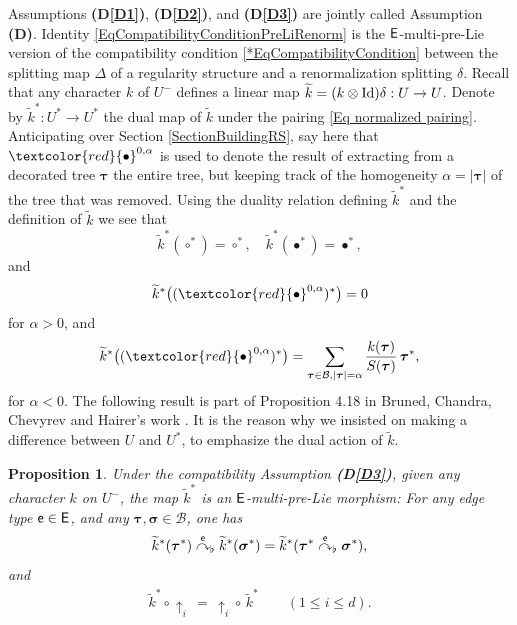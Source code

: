 \documentclass[10pt, reqno]{amsart}
\numberwithin{subsection}{section}
\numberwithin{subsubsection}{subsection}
\numberwithin{equation}{section} %
\theoremstyle{mystyle}
\newtheorem{prop}[thm]{\hspace{-0.13cm} {Proposition}}%
\theoremstyle{mystyle2}
\theoremstyle{mystyle3}
\newcommand{\refD}[1]{\textbf{\textsf{(D\ref{#1})}}}
\newcommand{\REFD}{\textbf{\textsf{(D)}}}
\newcommand{\iden}{\text{\rm Id}}
\newcommand{\bstau}{\boldsymbol{\tau}}
\newcommand{\bssigma}{\boldsymbol{\sigma}}
\newcommand{\flatgrafting}{\overset{\sf e}{\curvearrowright}_{\flat}}
\newcommand{\mcB}{\mathcal{B}}
\begin{document}
Assumptions \refD{D1}, \refD{D2}, and \refD{D3} are jointly called Assumption \REFD.
Identity \eqref{EqCompatibilityConditionPreLiRenorm} is the ${\sf E}$-multi-pre-Lie version of the compatibility condition \eqref{*EqCompatibilityCondition} between the splitting map $\Delta$ of a regularity structure and 
a renormalization splitting $\delta$. 
Recall that any character $k$ of $U^-$ defines a linear map $\widetilde{k}=(k\otimes\iden)\delta:U\to U$. Denote by $\widetilde{k}^*: U^*\rightarrow U^*$ the dual map of $\widetilde{k}$ under the pairing \eqref{Eq normalized pairing}. Anticipating over Section \ref{SectionBuildingRS}, say here that $\textcolor{red}{\bullet}^{0,\alpha}$ is used to denote the result of extracting from a decorated tree $\bstau$ the entire tree, but keeping track of the homogeneity $\alpha=\vert\bstau\vert$ of the tree that was removed. Using the duality relation defining $\widetilde{k}^*$ and the definition of $\widetilde{k}$ we see that 
$$
\widetilde{k}^*(\circ^*)=\circ^*,\quad \widetilde{k}^*(\bullet^*)=\bullet^*,
$$
and
$$
\widetilde{k}^*\big((\textcolor{red}{\bullet}^{0,\alpha})^*\big) = 0
$$
for $\alpha>0$, and 
$$
\widetilde{k}^*\big((\textcolor{red}{\bullet}^{0,\alpha})^*\big) = \sum_{\bstau\in\mcB,\vert\bstau\vert=\alpha} \frac{k(\bstau)}{S(\bstau)}\,\bstau^*,
$$
for $\alpha<0$. The following result is part of Proposition 4.18 in Bruned, Chandra, Chevyrev and Hairer's work \cite{BCCH18}. It is the reason why we insisted on making a difference between $U$ and $U^*$, to emphasize the dual action of $\widetilde{k}$.

\medskip

\begin{prop}   \label{PropRenormMultiPreLie}
Under the compatibility Assumption \refD{D3}, given any character $k$ on $U^-$, the map $\widetilde{k}^*$ is an ${\sf E}$-multi-pre-Lie morphism: For any edge type ${\sf e}\in {\sf E}$, and any $\bstau, \bssigma\in \mcB$, one has
$$
\widetilde{k}^*(\bstau^*)\flatgrafting\widetilde{k}^*(\bssigma^*) = \widetilde{k}^*(\bstau^*\flatgrafting\bssigma^*),
$$
and
\begin{align}\label{PropRenormMultiPreLieEq2}
\widetilde{k}^*\circ\uparrow_i\, =\, \uparrow_i\circ\,\widetilde{k}^* \qquad (1\leq i\leq d).
\end{align}
\end{prop}

\medskip
\end{document}

